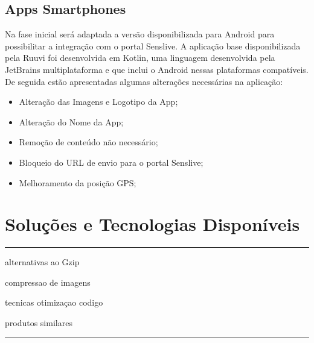 \subsection{Apps Smartphones}
Na fase inicial será adaptada a versão disponibilizada para Android para possibilitar a integração com o portal Senslive. A aplicação base disponibilizada pela Ruuvi foi desenvolvida em Kotlin\cite{ruuviappgithub}, uma linguagem desenvolvida pela JetBrains multiplataforma e que inclui o Android nessas plataformas compatíveis.
 De seguida estão apresentadas algumas alterações necessárias na aplicação:
\begin{itemize}
\item Alteração das Imagens e Logotipo da App;
\item Alteração do Nome da App;
\item Remoção de conteúdo não necessário;
\item Bloqueio do URL de envio para o portal Senslive;
\item Melhoramento da posição GPS;
\end{itemize}


\section{Soluções e Tecnologias Disponíveis} \label{solucoesDisponiveis}

{\color{red} \rule{\linewidth}{0.5mm} } 
alternativas ao Gzip
\par
compressao de imagens
\par
tecnicas otimizaçao codigo
\par
produtos similares
\par
{\color{red} \rule{\linewidth}{0.5mm} } 








